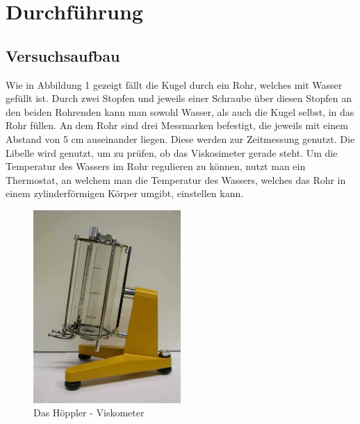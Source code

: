 \documentclass[titlepage=firstiscover, bibliography=totoc, captions=tableheading]{scrartcl}
\begin{document}
\section{Durchführung}
\label{sec:durchführung}
\subsection{Versuchsaufbau}
Wie in Abbildung 1 gezeigt fällt die Kugel durch ein Rohr, welches mit Wasser
gefüllt ist. Durch zwei Stopfen und jeweils einer Schraube über diesen Stopfen
an den beiden Rohrenden kann man sowohl Wasser, als auch die Kugel selbst, in das
Rohr füllen. An dem Rohr sind drei Messmarken befestigt, die jeweils mit einem
Abstand von 5 cm auseinander liegen. Diese werden zur Zeitmessung genutzt. Die
Libelle wird genutzt, um zu prüfen, ob das Viskosimeter gerade steht. Um die
Temperatur des Wassers im Rohr regulieren zu können, nutzt man ein Thermostat,
an welchem man die Temperatur des Wassers, welches das Rohr in einem
zylinderförmigen Körper umgibt, einstellen kann.
\begin{figure}[htb]
  \centering
  \includegraphics[width=0.5\textwidth]{figure/bild.png}
  \caption{Das Höppler - Viskometer}
  \label{fig:mein_label}
\end{figure}
\end{document}
